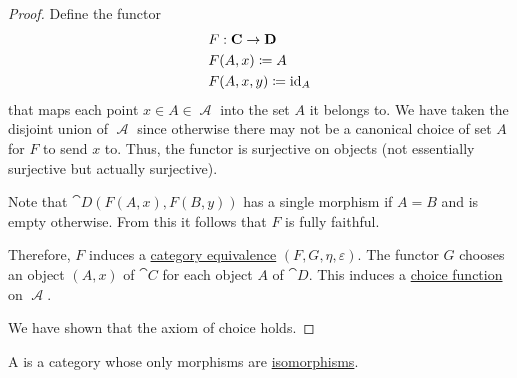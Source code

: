 \begin{proof}
  Define the functor
  \begin{equation*}
    \begin{aligned}
      &F: \operatorname{\mathbf{C}} \to \operatorname{\mathbf{D}} \\
      &F(A, x) \coloneqq A \\
      &F(A, x, y) \coloneqq \operatorname{id}_A
    \end{aligned}
  \end{equation*}
  that maps each point \( x \in A \in \mscrA \) into the set \( A \) it belongs to. We have taken the disjoint union of \( \mscrA \) since otherwise there may not be a canonical choice of set \( A \) for \( F \) to send \( x \) to. Thus, the functor is surjective on objects (not essentially surjective but actually surjective).

  Note that \( \cat{D}(F(A, x), F(B, y)) \) has a single morphism if \( A = B \) and is empty otherwise. From this it follows that \( F \) is fully faithful.

  Therefore, \( F \) induces a \hyperref[def:category_equivalence]{category equivalence} \( (F, G, \eta, \varepsilon) \). The functor \( G \) chooses an object \( (A, x) \) of \( \cat{C} \) for each object \( A \) of \( \cat{D} \). This induces a \hyperref[def:choice_function]{choice function} on \( \mscrA \).

  We have shown that the axiom of choice holds.
\end{proof}

\begin{definition}\label{def:groupoid}
  A  is a category whose only morphisms are \hyperref[def:morphism_invertibility/isomorphism]{isomorphisms}.
\end{definition}

